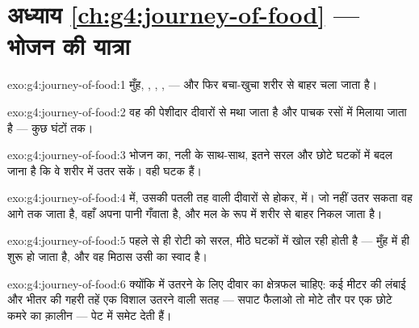 \section*{अध्याय \ref{ch:g4:journey-of-food} --- भोजन की यात्रा}

\begin{solution}{exo:g4:journey-of-food:1}
मुँह, , , ,  --- और फिर बचा-खुचा शरीर से
बाहर चला जाता है।
\end{solution}

\begin{solution}{exo:g4:journey-of-food:2}
वह  की पेशीदार दीवारों से मथा जाता है और पाचक रसों में मिलाया
जाता है --- कुछ घंटों तक।
\end{solution}

\begin{solution}{exo:g4:journey-of-food:3}
 भोजन का, नली के साथ-साथ, इतने सरल और छोटे घटकों में बदल जाना है कि
वे शरीर में उतर सकें। वही घटक  हैं।
\end{solution}

\begin{solution}{exo:g4:journey-of-food:4}
 में, उसकी पतली तह वाली दीवारों से होकर,  में। जो नहीं उतर
सकता वह आगे  तक जाता है, वहाँ अपना पानी गँवाता है, और मल के
रूप में शरीर से बाहर निकल जाता है।
\end{solution}

\begin{solution}{exo:g4:journey-of-food:5}
 पहले से ही रोटी को सरल, मीठे घटकों में खोल रही होती है --- 
मुँह में ही शुरू हो जाता है, और वह मिठास उसी का स्वाद है।
\end{solution}

\begin{solution}{exo:g4:journey-of-food:6}
क्योंकि  में उतरने के लिए दीवार का क्षेत्रफल चाहिए: कई मीटर की
लंबाई और भीतर की गहरी तहें एक विशाल उतरने वाली सतह --- सपाट फैलाओ तो
मोटे तौर पर एक छोटे कमरे का क़ालीन --- पेट में समेट देती हैं।
\end{solution}

